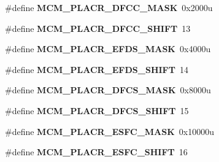 \begin{DoxyCompactItemize}
\item 
\hypertarget{group___m_c_m___register___masks_ga3a3b01206691dd0da2cc1699d7aff12f}{}\#define {\bfseries M\+C\+M\+\_\+\+P\+L\+A\+C\+R\+\_\+\+D\+F\+C\+C\+\_\+\+M\+A\+S\+K}~0x2000u\label{group___m_c_m___register___masks_ga3a3b01206691dd0da2cc1699d7aff12f}

\item 
\hypertarget{group___m_c_m___register___masks_ga43547ea594fc5be9183ff24f3bdcdee7}{}\#define {\bfseries M\+C\+M\+\_\+\+P\+L\+A\+C\+R\+\_\+\+D\+F\+C\+C\+\_\+\+S\+H\+I\+F\+T}~13\label{group___m_c_m___register___masks_ga43547ea594fc5be9183ff24f3bdcdee7}

\item 
\hypertarget{group___m_c_m___register___masks_ga90eea584eb5978a2ddfee057cd2fec28}{}\#define {\bfseries M\+C\+M\+\_\+\+P\+L\+A\+C\+R\+\_\+\+E\+F\+D\+S\+\_\+\+M\+A\+S\+K}~0x4000u\label{group___m_c_m___register___masks_ga90eea584eb5978a2ddfee057cd2fec28}

\item 
\hypertarget{group___m_c_m___register___masks_gab4f3cedc3a9560ddb10ca0cddaab74dd}{}\#define {\bfseries M\+C\+M\+\_\+\+P\+L\+A\+C\+R\+\_\+\+E\+F\+D\+S\+\_\+\+S\+H\+I\+F\+T}~14\label{group___m_c_m___register___masks_gab4f3cedc3a9560ddb10ca0cddaab74dd}

\item 
\hypertarget{group___m_c_m___register___masks_ga336a7d6634a1b5f72698ee41e1768d08}{}\#define {\bfseries M\+C\+M\+\_\+\+P\+L\+A\+C\+R\+\_\+\+D\+F\+C\+S\+\_\+\+M\+A\+S\+K}~0x8000u\label{group___m_c_m___register___masks_ga336a7d6634a1b5f72698ee41e1768d08}

\item 
\hypertarget{group___m_c_m___register___masks_gab9eab0c37b97341f1af2e72ec3c299e6}{}\#define {\bfseries M\+C\+M\+\_\+\+P\+L\+A\+C\+R\+\_\+\+D\+F\+C\+S\+\_\+\+S\+H\+I\+F\+T}~15\label{group___m_c_m___register___masks_gab9eab0c37b97341f1af2e72ec3c299e6}

\item 
\hypertarget{group___m_c_m___register___masks_gadfd414b0c13cb1d199238e5a312a153d}{}\#define {\bfseries M\+C\+M\+\_\+\+P\+L\+A\+C\+R\+\_\+\+E\+S\+F\+C\+\_\+\+M\+A\+S\+K}~0x10000u\label{group___m_c_m___register___masks_gadfd414b0c13cb1d199238e5a312a153d}

\item 
\hypertarget{group___m_c_m___register___masks_gae370a0400b2ce8cef0416ee11b9898f8}{}\#define {\bfseries M\+C\+M\+\_\+\+P\+L\+A\+C\+R\+\_\+\+E\+S\+F\+C\+\_\+\+S\+H\+I\+F\+T}~16\label{group___m_c_m___register___masks_gae370a0400b2ce8cef0416ee11b9898f8}


\end{DoxyCompactItemize}
